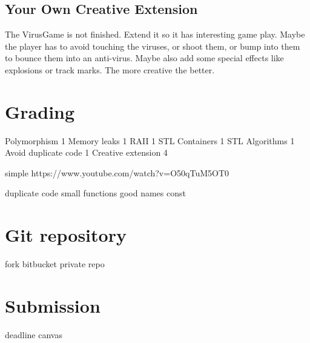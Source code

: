 \documentclass[12pt]{article}
\begin{document}
\subsection{Your Own Creative Extension}
The VirusGame is not finished. Extend it so it has interesting game
play. Maybe the player has to avoid touching the viruses, or shoot
them, or bump into them to bounce them into an anti-virus. Maybe also
add some special effects like explosions or track marks. The more
creative the better.

\section{Grading}

Polymorphism          1
Memory leaks          1
RAII                  1
STL Containers        1
STL Algorithms        1
Avoid duplicate code  1
Creative extension    4

simple
https://www.youtube.com/watch?v=O50qTuM5OT0

duplicate code
small functions
good names
const

\section{Git repository}
fork bitbucket private repo

\section{Submission}
deadline
canvas
\end{document}
